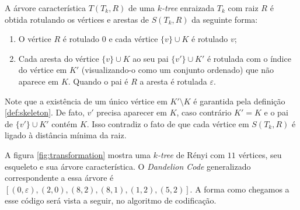 \begin{definition}
  \label{def:chartree}
  \cite{caminiti} A árvore característica $T(T_k, R)$ de uma \emph{$k$-tree} enraizada $T_k$ com raiz $R$ é obtida rotulando os vértices e arestas de $S(T_k, R)$ da seguinte forma:

  \begin{enumerate}
    \item O vértice $R$ é rotulado $0$ e cada vértice $\{v\} \cup K$ é rotulado $v$;
    \item Cada aresta do vértice $\{v\} \cup K$ ao seu pai $\{v'\} \cup K'$ é rotulada com o índice do vértice em $K'$ (visualizando-o como um conjunto ordenado) que não aparece em $K$. Quando o pai é $R$ a aresta é rotulada $\varepsilon$.
  \end{enumerate}

  Note que a existência de um único vértice em $K' \setminus K$ é garantida pela definição \ref{def:skeleton}. De fato, $v'$ precisa aparecer em $K$, caso contrário $K' = K$ e o pai de $\{v'\} \cup K'$ contém $K$. Isso contradiz o fato de que cada vértice em $S(T_k, R)$ é ligado à distância mínima da raiz.
\end{definition}

A figura \ref{fig:transformation} mostra uma \emph{$k$-tree} de Rényi com $11$ vértices, seu esqueleto e sua árvore característica. O \emph{Dandelion Code} generalizado correspondente a essa árvore é $[(0, \varepsilon), (2, 0), (8, 2), (8, 1), (1, 2), (5, 2)]$. A forma como chegamos a esse código será vista a seguir, no algoritmo de codificação.

